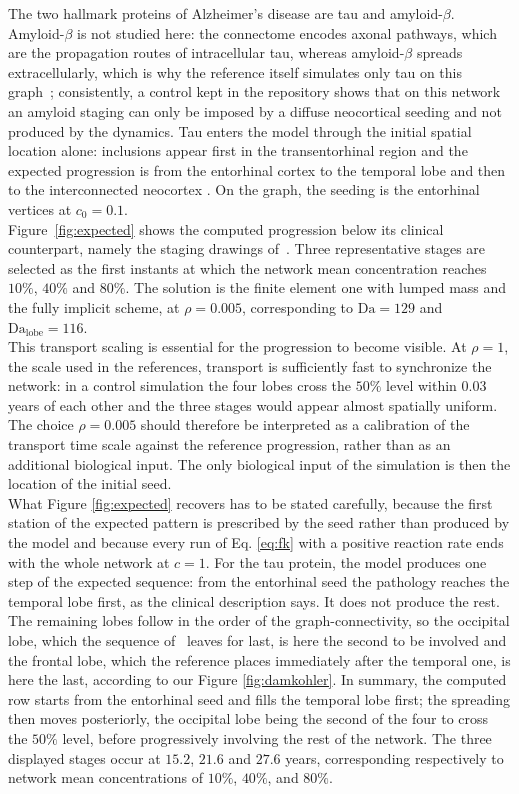 The two hallmark proteins of Alzheimer's disease are tau and amyloid-$\beta$. Amyloid-$\beta$ is not studied here: the connectome encodes axonal pathways, which are the propagation routes of intracellular tau, whereas amyloid-$\beta$ spreads extracellularly, which is why the reference itself simulates only tau on this graph~\cite{fornari2019prion}; consistently, a control kept in the repository shows that on this network an amyloid staging can only be imposed by a diffuse neocortical seeding and not produced by the dynamics. Tau enters the model through the initial spatial location alone: inclusions appear first in the transentorhinal region and the expected progression is from the entorhinal cortex to the temporal lobe and then to the interconnected neocortex \cite{weickenmeier2019prion}. On the graph, the seeding is the entorhinal vertices at $c_0=0.1$.\\
Figure~\ref{fig:expected} shows the computed progression below its clinical counterpart, namely the staging drawings of~\cite{weickenmeier2019prion}. Three representative stages are selected as the first instants at which the network mean concentration reaches $10\%$, $40\%$ and $80\%$. The solution is the finite element one with lumped mass and the fully implicit scheme, at $\rho=0.005$, corresponding to $\mathrm{Da}=129$ and $\mathrm{Da}_{\mathrm{lobe}}=116$.\\
This transport scaling is essential for the progression to become visible. At $\rho=1$, the scale used in the references, transport is sufficiently fast to synchronize the network: in a control simulation the four lobes cross the $50\%$ level within $0.03$ years of each other and the three stages would appear almost spatially uniform. The choice $\rho=0.005$ should therefore be interpreted as a calibration of the transport time scale against the reference progression, rather than as an additional biological input. The only biological input of the simulation is then the location of the initial seed.\\
What Figure \ref{fig:expected} recovers has to be stated carefully, because the first station of the expected pattern is prescribed by the seed rather than produced by the model and because every run of Eq. \eqref{eq:fk} with a positive reaction rate ends with the whole network at $c=1$. For the tau protein, the model produces one step of the expected sequence: from the entorhinal seed the pathology reaches the temporal lobe first, as the clinical description says. It does not produce the rest. The remaining lobes follow in the order of the graph-connectivity, so the occipital lobe, which the sequence of~\cite{fornari2019prion} leaves for last, is here the second to be involved and the frontal lobe, which the reference places immediately after the temporal one, is here the last, according to our Figure \ref{fig:damkohler}. In summary, the computed row starts from the entorhinal seed and fills the temporal lobe first; the spreading then moves posteriorly, the occipital lobe being the second of the four to cross the $50\%$ level, before progressively involving the rest of the network. The three displayed stages occur at $15.2$, $21.6$ and $27.6$ years, corresponding respectively to network mean concentrations of $10\%$, $40\%$, and $80\%$.\\
